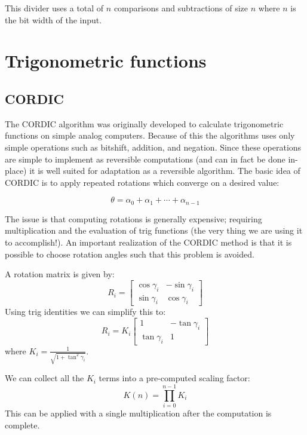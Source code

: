     This divider uses a total of $n$ comparisons and subtractions of size $n$
    where $n$ is the bit width of the input.

\section{Trigonometric functions}
    \subsection{CORDIC}

	The CORDIC\cite{V:1959} algorithm was originally developed to calculate
	trigonometric functions on simple analog computers. Because of this the
	algorithms uses only simple operations such as bitshift, addition, and
	negation. Since these operations are simple to implement as reversible
	computations (and can in fact be done in-place) it is well suited for
	adaptation as a reversible algorithm. The basic idea of CORDIC is to
	apply repeated rotations which converge on a desired value:

        \[ \theta = \alpha_0 + \alpha_1 + \dotsb + \alpha_{n-1} \]

	The issue is that computing rotations is generally expensive; requiring
	multiplication and the evaluation of trig functions (the very thing we
	are using it to accomplish!). An important realization of the CORDIC
	method is that it is possible to choose rotation angles such that this
	problem is avoided.

        A rotation matrix is given by:
        \[
          R_i = \begin{bmatrix}
            \cos\gamma_i & -\sin\gamma_i \\
            \sin\gamma_i & \cos\gamma_i
          \end{bmatrix}
        \]
        Using trig identities we can simplify this to:
        \[
          R_i = K_i
                \begin{bmatrix}
                  1            & -\tan\gamma_i \\
                  \tan\gamma_i & 1
                \end{bmatrix}
        \]
        where $K_i = \frac{1}{\sqrt{1+\tan^2\gamma_i}}$.

        We can collect all the $K_i$ terms into a pre-computed scaling factor:
        \[ K(n) = \prod_{i=0}^{n-1}K_i \]
        This can be applied with a single multiplication after the computation is complete.

